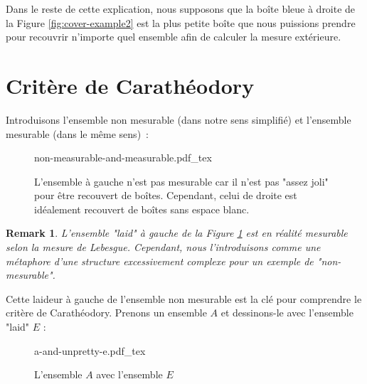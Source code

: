 \documentclass[a4paper]{article}
\newcommand{\incfig}[1]{%
    \def\svgwidth{\columnwidth}
    {#1.pdf_tex}
}
\newtheorem*{remark}{Remark}
\begin{document}
Dans le reste de cette explication, nous supposons que la boîte bleue à droite de la Figure \ref{fig:cover-example2} est la plus petite boîte que nous puissions prendre pour recouvrir n’importe quel ensemble afin de calculer la mesure extérieure.%
\section{Critère de Carathéodory}%
Introduisons l'ensemble non mesurable (dans notre sens simplifié) et l'ensemble mesurable (dans le même sens) :%
\begin{figure}[H]
    \centering
    \incfig{non-measurable-and-measurable}
    \caption{L'ensemble à gauche n'est pas mesurable car il n'est pas "assez joli" pour être recouvert de boîtes. Cependant, celui de droite est idéalement recouvert de boîtes sans espace blanc.}
    \label{fig:non-measurable-and-measurable}
\end{figure}%
\begin{remark}
    L'ensemble "laid" à gauche de la Figure
    \ref{fig:non-measurable-and-measurable} est en réalité mesurable selon la mesure de Lebesgue. Cependant, nous l'introduisons comme une métaphore d'une structure excessivement complexe pour un exemple de "non-mesurable".
\end{remark}%
Cette laideur à gauche de l'ensemble non mesurable est la clé pour comprendre le critère de Carathéodory. Prenons un ensemble $A$ et dessinons-le avec l'ensemble "laid" $E$ :%
\begin{figure}[H]
    \centering
    \incfig{a-and-unpretty-e}
    \caption{L'ensemble $A$ avec l'ensemble $E$}
    \label{fig:a-and-unpretty-e}
\end{figure}%
\end{document}
